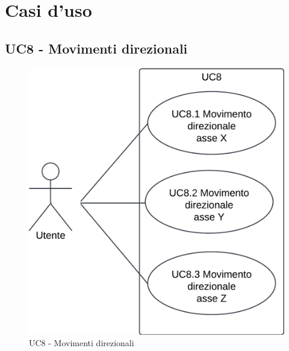 \section{Casi d'uso}

\subsection{UC8 - Movimenti direzionali}
\begin{figure}[h!]\centering
    \includegraphics[scale=0.7]{template/images/UC8.png}
    \caption{UC8 - Movimenti direzionali}
\end{figure}
